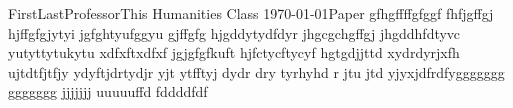 \documentclass[12pt,letterpaper]{article}
\begin{document}
\begin{mla}{First}{Last}{Professor}{This Humanities Class}%
  {\today}{Paper}
gfhgffffgfggf fhfjgffgj hjffgfgjytyi jgfghtyufggyu gjffgfg hjgddytydfdyr jhgcgchgffgj jhgddhfdtyvc yutyttytukytu xdfxftxdfxf jgjgfgfkuft hjfctycftycyf hgtgdjjttd xydrdyrjxfh ujtdtfjtfjy ydyftjdrtydjr yjt ytfftyj dydr dry tyrhyhd r jtu jtd  yjyxjdfrdfyggggggg ggggggg jjjjjjj uuuuuffd fddddfdf
  \printbibliography
\end{mla}
\end{document}
